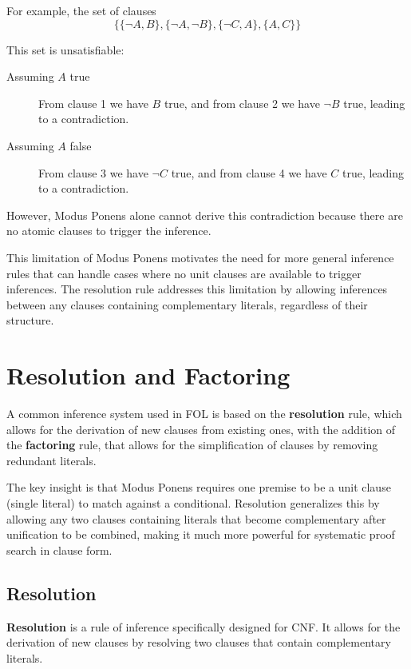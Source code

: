 For example, the set of clauses
\begin{equation}\label{eq:example_unsat}  
  \{\{\neg A, B\},\{\neg A , \neg B\}, \{\neg C , A\}, \{A , C\}\}
\end{equation}


This set is unsatisfiable:
\begin{description}
  \item[Assuming \(A\) true] From clause 1 we have \(B\) true, and from clause 2 we have \(\neg B\) true, leading to a contradiction.
  \item[Assuming \(A\) false] From clause 3 we have \(\neg C\) true, and from clause 4 we have \(C\) true, leading to a contradiction.
\end{description}
However, Modus Ponens alone cannot derive this contradiction because there are no atomic clauses to trigger the inference.

This limitation of Modus Ponens motivates the need for more general inference rules that can handle cases where no unit clauses are available to trigger inferences.
The resolution rule addresses this limitation by allowing inferences between any clauses containing complementary literals, regardless of their structure.

\section{Resolution and Factoring}\label{sec:resolution-factoring}

A common inference system used in FOL is based on the \textbf{resolution} rule, which allows for the derivation of new clauses from existing ones, with the addition of the \textbf{factoring} rule, that allows for the simplification of clauses by removing redundant literals.

The key insight is that Modus Ponens requires one premise to be a unit clause (single literal) to match against a conditional.
Resolution generalizes this by allowing any two clauses containing literals that become complementary after unification to be combined, making it much more powerful for systematic proof search in clause form.

\subsection{Resolution}

\textbf{Resolution} is a rule of inference specifically designed for CNF\@. It allows for the derivation of new clauses by resolving two clauses that contain complementary literals.

